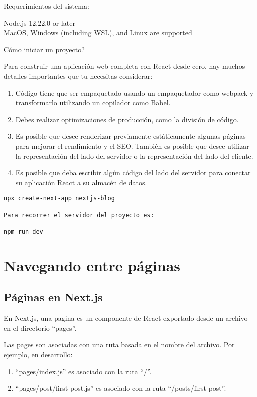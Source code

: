 Requerimientos del sistema: 

Node.js 12.22.0 or later\\
MacOS, Windows (including WSL), and Linux are supported


C\'omo iniciar un proyecto?

Para construir una aplicaci\'on web completa con React desde cero, hay muchos detalles importantes que tu necesitas considerar: 
\begin{enumerate}
	\item C\'odigo tiene que ser empaquetado usando un empaquetador como webpack y transformarlo utilizando un copilador como Babel.
	\item Debes realizar optimizaciones de producci\'on, como la divisi\'on de c\'odigo.
	\item Es posible que desee renderizar previamente est\'aticamente algunas p\'aginas para mejorar el rendimiento y el SEO. Tambi\'en es posible que desee utilizar la representaci\'on del lado del servidor o la representaci\'on del lado del cliente.
	
	
	\item Es posible que deba escribir alg\'un c\'odigo del lado del servidor para conectar su aplicaci\'on React a su almac\'en de datos.
\end{enumerate}
\begin{verbatim}
npx create-next-app nextjs-blog

Para recorrer el servidor del proyecto es:

npm run dev
\end{verbatim}

\section{Navegando entre p\'aginas}

\subsection{P\'aginas en Next.js}
En Next.js, una pagina es un componente de React exportado desde un archivo en el directorio ``pages''.

Las pages son asociadas con una ruta basada en el nombre del archivo. Por ejemplo, en desarrollo:
\begin{enumerate}
	\item ``pages/index.js'' es asociado con la ruta ``/''.
	\item ``pages/post/first-post.js'' es asociado con la ruta ``/posts/first-post''.
\end{enumerate}

